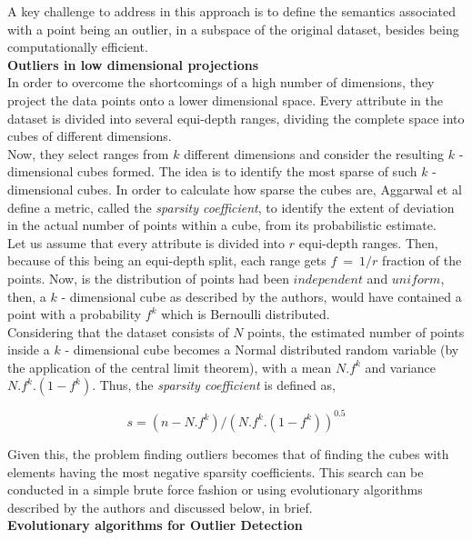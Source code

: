 A key challenge to address in this approach is to define the semantics associated with a point being an outlier, in a subspace of the original dataset, besides being computationally efficient. \\

\noindent \textbf{Outliers in low dimensional projections} \\

In order to overcome the shortcomings of a high number of dimensions, they project the data points onto a lower dimensional space. Every attribute in the dataset is divided into several equi-depth ranges, dividing the complete space into cubes of different dimensions. \\ 

Now, they select ranges from $k$ different dimensions and consider the resulting $k$ - dimensional cubes formed. The idea is to identify the most sparse of such $k$ - dimensional cubes. In order to calculate how sparse the cubes are, Aggarwal et al define a metric, called the \textit{sparsity coefficient}, to identify the extent of deviation in the actual number of points within a cube, from its probabilistic estimate. \\

Let us assume that every attribute is divided into $r$ equi-depth ranges. Then, because of this being an equi-depth split, each range gets $f\ =\ 1/r$ fraction of the points. Now, is the distribution of points had been $independent$ and $uniform$, then, a $k$ - dimensional cube as described by the authors, would have contained a point with a probability $f^k$ which is Bernoulli distributed. \\

Considering that the dataset consists of $N$ points, the estimated number of points inside a $k$ - dimensional cube becomes a Normal distributed random variable (by the application of the central limit theorem), with a mean $N.f^k$ and variance $N.f^k.(1-f^k)$. Thus, the \textit{sparsity coefficient} is defined as,

$$s = (n - N.f^k)/(N.f^k.(1-f^k))^{0.5}$$

Given this, the problem finding outliers becomes that of finding the cubes with elements having the most negative sparsity coefficients. This search can be conducted in a simple brute force fashion or using evolutionary algorithms described by the authors and discussed below, in brief. \\

\noindent \textbf{Evolutionary algorithms for Outlier Detection} \\

